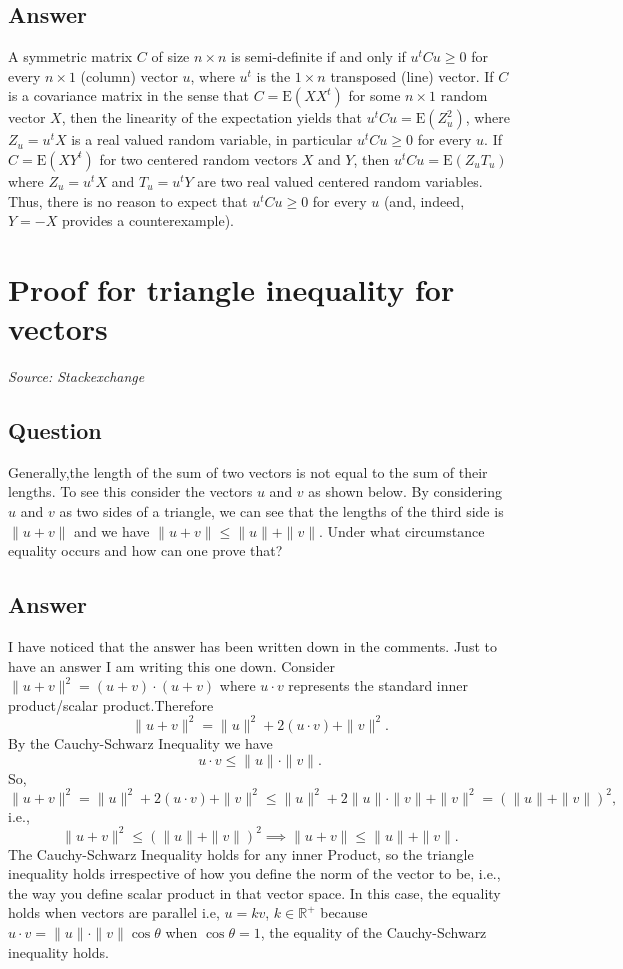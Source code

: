 \documentclass{article}
\begin{document}
\subsection*{Answer}
A symmetric matrix $C$ of size $n\times n$ is semi-definite if and only if $u^tCu\geqslant0$ for every $n\times1$ (column) vector $u$, where $u^t$ is the $1\times n$ transposed (line) vector. If $C$ is a covariance matrix in the sense that $C=\mathrm E(XX^t)$ for some $n\times 1$ random vector $X$, then the linearity of the expectation yields that $u^tCu=\mathrm E(Z_u^2)$, where $Z_u=u^tX$ is a real valued random variable, in particular $u^tCu\geqslant0$ for every $u$. If $C=\mathrm E(XY^t)$ for two centered random vectors $X$ and $Y$, then $u^tCu=\mathrm E(Z_uT_u)$ where $Z_u=u^tX$ and $T_u=u^tY$ are two real valued centered random variables. Thus, there is no reason to expect that $u^tCu\geqslant0$ for every $u$ (and, indeed, $Y=-X$ provides a counterexample).

\newpage

\section{Proof for triangle inequality for vectors}
\textit{Source: Stackexchange}

\subsection*{Question}
Generally,the length of the sum of two vectors is not equal to the sum of their lengths. To see this consider the vectors $u$ and $v$ as shown below. By considering $u$ and $v$ as two sides of a triangle, we can see that the lengths of the third side is $\| u + v \|$ and we have $\| u + v \| \leq \|u\| + \|v\|$. Under what circumstance equality occurs and how can one prove that?

\subsection*{Answer}
I have noticed that the answer has been written down in the comments. Just to have an answer I am writing this one down. Consider $\|u+v\|^2=(u+v) \cdot (u+v)$ where $u \cdot v$ represents the standard inner product/scalar product.Therefore $$\|u+v\|^2=\|u\|^2+2 (u \cdot v) + \|v\|^2 .$$ By the Cauchy-Schwarz Inequality we have $$u \cdot v \leq \|u\| \cdot \|v\|.$$ So, $$\|u+v \|^2= \|u\|^2+2(u \cdot v)+ \|v \|^2 \leq \|u\|^2+ 2 \|u\| \cdot \|v\| + \|v\|^2=(\|u\|+ \|v\|)^2 ,$$ i.e., $$\|u+v\|^2 \leq (\|u\|+ \|v\|)^2 \implies \|u+v\| \leq \|u \|+ \|v\| .$$ The Cauchy-Schwarz Inequality holds for any inner Product, so the triangle inequality holds irrespective of how you define the norm of the vector to be, i.e., the way you define scalar product in that vector space. In this case, the equality holds when vectors are parallel i.e, $u=kv$, $k \in \mathbb{R}^+$ because $u \cdot v= \|u \| \cdot \|v\| \cos \theta$ when $\cos \theta=1$, the equality of the Cauchy-Schwarz inequality holds.

\newpage
\end{document}
